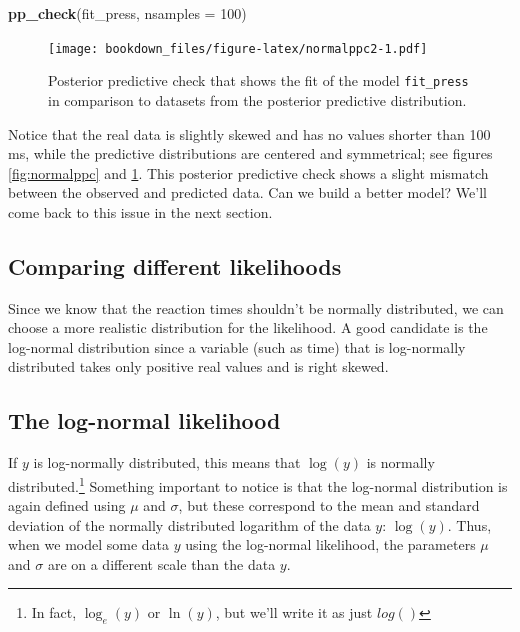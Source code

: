 \documentclass[12pt,]{krantz}
\newenvironment{Shaded}{\begin{snugshade}}{\end{snugshade}}
\newcommand{\KeywordTok}[1]{\textcolor[rgb]{0.13,0.29,0.53}{\textbf{#1}}}
\newcommand{\DataTypeTok}[1]{\textcolor[rgb]{0.13,0.29,0.53}{#1}}
\newcommand{\DecValTok}[1]{\textcolor[rgb]{0.00,0.00,0.81}{#1}}
\newcommand{\NormalTok}[1]{#1}
\theoremstyle{definition}
\theoremstyle{definition}
\theoremstyle{definition}
\theoremstyle{remark}
\begin{document}
\begin{Shaded}
\begin{Highlighting}[]
\KeywordTok{pp_check}\NormalTok{(fit_press, }\DataTypeTok{nsamples =} \DecValTok{100}\NormalTok{)}
\end{Highlighting}
\end{Shaded}

\begin{figure}
\centering
\texttt{[image: bookdown\_files/figure-latex/normalppc2-1.pdf]}
\caption{\label{fig:normalppc2}Posterior predictive check that shows the fit of the
model \texttt{fit\_press} in comparison to datasets from the posterior
predictive distribution.}
\end{figure}

Notice that the real data is slightly skewed and has no values shorter
than 100 ms, while the predictive distributions are centered and
symmetrical; see figures \ref{fig:normalppc} and \ref{fig:normalppc2}.
This posterior predictive check shows a slight mismatch between the
observed and predicted data. Can we build a better model? We'll come
back to this issue in the next section.

\subsection{Comparing different
likelihoods}\label{comparing-different-likelihoods}

Since we know that the reaction times shouldn't be normally distributed,
we can choose a more realistic distribution for the likelihood. A good
candidate is the log-normal distribution since a variable (such as time)
that is log-normally distributed takes only positive real values and is
right skewed.

\subsection{The log-normal likelihood}\label{sec:lnfirst}

If \(y\) is log-normally distributed, this means that \(\log(y)\) is
normally distributed.\footnote{In fact, \(\log_e(y)\) or \(\ln(y)\), but
  we'll write it as just \(log()\)} Something important to notice is
that the log-normal distribution is again defined using \(\mu\) and
\(\sigma\), but these correspond to the mean and standard deviation of
the normally distributed logarithm of the data \(y\): \(\log(y)\). Thus,
when we model some data \(y\) using the log-normal likelihood, the
parameters \(\mu\) and \(\sigma\) are on a different scale than the data
\(y\).
\end{document}
